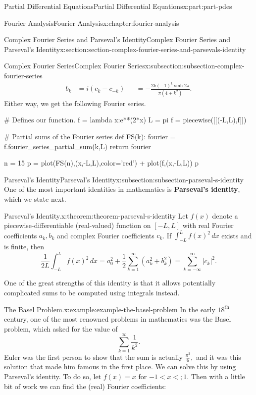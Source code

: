 \documentclass[oneside,10pt,]{book}
\newcommand{\terminology}[1]{\textbf{#1}}
\numberwithin{equation}{part}
\newcommand{\lt}{<}
\newcommand{\amp}{&}
\begin{document}
\begin{partptx}{Partial Differential Equations}{}{Partial Differential Equations}{}{}{x:part:part-pdes}
\begin{chapterptx}{Fourier Analysis}{}{Fourier Analysis}{}{}{x:chapter:fourier-analysis}
\begin{sectionptx}{Complex Fourier Series and Parseval's Identity}{}{Complex Fourier Series and Parseval's Identity}{}{}{x:section:section-complex-fourier-series-and-parsevals-identity}
\begin{subsectionptx}{Complex Fourier Series}{}{Complex Fourier Series}{}{}{x:subsection:subsection-complex-fourier-series}
\begin{align*}
b_{k} \amp = i(c_{k}-c_{-k}) \amp \amp= -\frac{2k(-1)^{k}\sinh2\pi}{\pi(4+k^{2})}. 
\end{align*}
Either way, we get the following Fourier series.%
\begin{sageinput}
# Defines our function.
f = lambda x:e**(2*x)
L = pi
f = piecewise([[(-L,L),f]])

# Partial sums of the Fourier series
def FS(k):
  fourier = f.fourier_series_partial_sum(k,L)
  return fourier

n = 15
p = plot(FS(n),(x,-L,L),color='red') + plot(f,(x,-L,L))
p
\end{sageinput}
\end{subsectionptx}
%
%
\typeout{************************************************}
\typeout{************************************************}
%
\begin{subsectionptx}{Parseval's Identity}{}{Parseval's Identity}{}{}{x:subsection:subsection-parseval-s-identity}
One of the most important identities in mathematics is \terminology{Parseval's identity}, which we state next.%
\begin{theorem}{Parseval's Identity.}{}{x:theorem:theorem-parseval-s-identity}%
%
Let \(f(x)\) denote a piecewise-differentiable (real-valued) function on \([-L,L]\) with real Fourier coefficients \(a_{k},b_{k}\) and complex Fourier coefficients \(c_{k}\). If \(\int_{-L}^{L}f(x)^{2}\,dx\) exists and is finite, then%
\begin{equation*}
\frac{1}{2L}\int_{-L}^{L}f(x)^{2}\,dx = a^{2}_{0} + \frac{1}{2}\sum_{k=1}^{\infty}(a^{2}_{k}+b^{2}_{k}) = \sum_{k=-\infty}^{\infty}|c_{k}|^{2}.
\end{equation*}
%
\end{theorem}
One of the great strengths of this identity is that it allows potentially complicated sums to be computed using integrals instead.%
\begin{example}{The Basel Problem.}{x:example:example-the-basel-problem}%
%
In the early \(18^{\text{th}}\) century, one of the most renowned problems in mathematics was the Basel problem, which asked for the value of%
\begin{equation*}
\sum_{k=1}^{\infty}\frac{1}{k^{2}}.
\end{equation*}
Euler was the first person to show that the sum is actually \(\frac{\pi^{2}}{6},\) and it was this solution that made him famous\footnotemark{} in the first place. We can solve this by using Parseval's identity. To do so, let \(f(x) = x\) for \(-1 \lt x \lt; 1\). Then with a little bit of work we can find the (real) Fourier coefficients:%

\end{example}
\end{subsectionptx}
\end{sectionptx}
\end{chapterptx}
\end{partptx}
\end{document}
